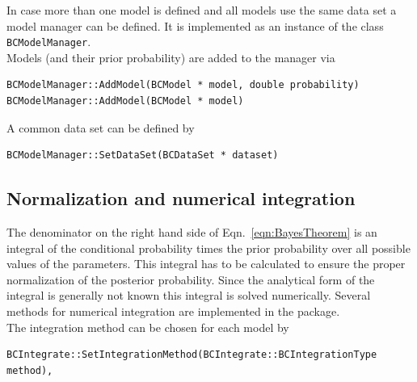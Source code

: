 \documentclass[11pt, a4paper]{article}
\begin{document}
In case more than one model is defined and all models use the same
data set a model manager can be defined. It is implemented as an
instance of the class \verb|BCModelManager|. \\ 

\noindent 
Models (and their prior probability) are added to the manager via
\begin{small}
\begin{verbatim}
BCModelManager::AddModel(BCModel * model, double probability) 
BCModelManager::AddModel(BCModel * model) 
\end{verbatim} 
\end{small} 

A common data set can be defined by 
\begin{small}
\begin{verbatim}
BCModelManager::SetDataSet(BCDataSet * dataset) 
\end{verbatim} 
\end{small} 


\subsection{Normalization and numerical integration} 

The denominator on the right hand side of Eqn.~\ref{eqn:BayesTheorem}
is an integral of the conditional probability times the prior
probability over all possible values of the parameters. This integral
has to be calculated to ensure the proper normalization of the
posterior probability. Since the analytical form of the integral is
generally not known this integral is solved numerically. Several
methods for numerical integration are implemented in the package. \\ 

\noindent 
The integration method can be chosen for each model by 
%
\begin{small}
\begin{verbatim}
BCIntegrate::SetIntegrationMethod(BCIntegrate::BCIntegrationType method), 
\end{verbatim} 
\end{small} 
\end{document}
